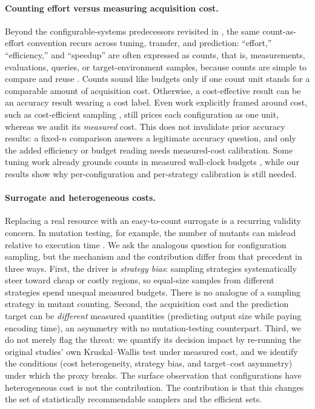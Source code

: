 \paragraph*{Counting effort versus measuring acquisition cost.}
Beyond the configurable-systems predecessors revisited in ,
the same count-as-effort convention recurs across tuning, transfer, and
prediction: ``effort,'' ``efficiency,'' and ``speedup'' are often expressed as
counts, that is, measurements, evaluations, queries, or target-environment
samples, because counts are simple to compare and reuse
\cite{nair2020flash,chen2021mmo,chen2024admmo,ye2025dlisa,gong2023dal,gong2024sempl}.
Counts sound like budgets only if one count unit stands for a comparable amount
of acquisition cost. Otherwise, a cost-effective result can be an accuracy
result wearing a cost label. Even work explicitly framed around cost, such as
cost-efficient sampling \cite{sarkar2015}, still prices each configuration as one
unit, whereas we audit its \emph{measured} cost. This does not invalidate prior accuracy results: a
fixed-$n$ comparison answers a legitimate accuracy question, and only the added
efficiency or budget reading needs measured-cost calibration. Some tuning work
already grounds counts in measured wall-clock budgets
\cite{chen2021multiobj,chen2023aspirations}, while our results show why
per-configuration and per-strategy calibration is still needed.

\paragraph*{Surrogate and heterogeneous costs.}
Replacing a real resource with an easy-to-count surrogate is a recurring
validity concern. In mutation testing, for example, the number of mutants can
mislead relative to execution time \cite{harmanMutationFSE2020}. We ask the
analogous question for configuration sampling, but the mechanism and the
contribution differ from that precedent in three ways. First, the driver is
\emph{strategy bias}: sampling strategies systematically steer toward cheap or
costly regions, so equal-size samples from different strategies spend unequal
measured budgets. There is no analogue of a sampling strategy in mutant
counting. Second, the acquisition cost and the prediction target can be
\emph{different} measured quantities (predicting output size while paying
encoding time), an asymmetry with no mutation-testing counterpart. Third, we do
not merely flag the threat: we quantify its decision impact by re-running the
original studies' own Kruskal--Wallis test under measured cost, and we identify
the conditions (cost heterogeneity, strategy bias, and target--cost
asymmetry) under which the proxy breaks. The surface observation that
configurations have heterogeneous cost is not the contribution. The contribution
is that this changes the set of statistically recommendable samplers and the
efficient sets.

